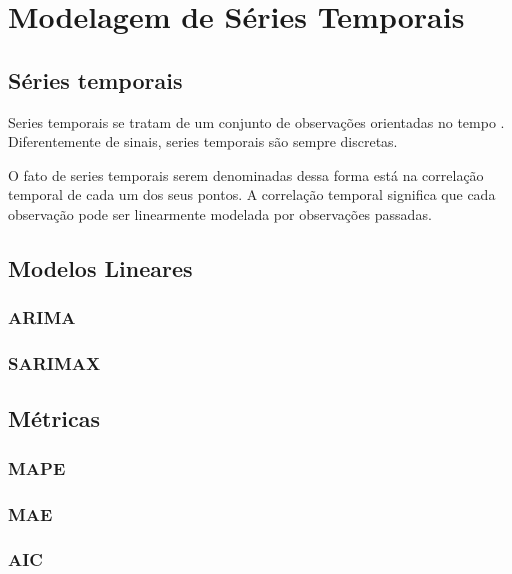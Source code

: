 \chapter{Modelagem de Séries Temporais}
\label{cap:series_temp}

\section{Séries temporais}


Series temporais se tratam de um conjunto de observações orientadas no tempo \cite{brockwell2002introduction}. Diferentemente de sinais, series temporais são sempre discretas.

O fato de series temporais serem denominadas dessa forma está na correlação temporal de cada um dos seus pontos. A correlação temporal significa que cada observação pode ser linearmente modelada por observações passadas. 

\section{Modelos Lineares}

\subsection{ARIMA}

\subsection{SARIMAX}

\section{Métricas}

\subsection{MAPE}

\subsection{MAE}

\subsection{AIC}

%
%
